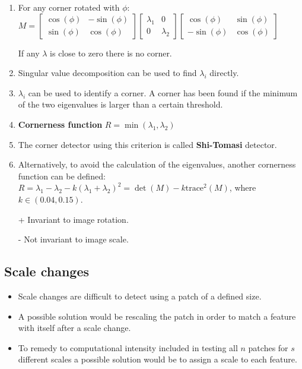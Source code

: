 \documentclass[10pt,a4paper]{scrartcl}
\begin{document}
\begin{multicols*}{2}
\begin{enumerate}
\item For any corner rotated with $\phi$: $M=\begin{bmatrix}
\cos(\phi)&-\sin(\phi)\\\sin(\phi)&\cos(\phi)
\end{bmatrix}
\begin{bmatrix}
\lambda_1&0\\0&\lambda_2
\end{bmatrix}
\begin{bmatrix}
\cos(\phi)&\sin(\phi)\\-\sin(\phi)&\cos(\phi)
\end{bmatrix}$

If any $\lambda$ is close to zero there is no corner.

\item Singular value decomposition can be used to find $\lambda_i$ directly.
\item $\lambda_i$ can be used to identify a corner. A corner has been found if the minimum of the two eigenvalues is larger than a certain threshold.
\item \textbf{Cornerness function} $R=\min(\lambda_1,\lambda_2)$

\item The corner detector using this criterion is called \textbf{Shi-Tomasi} detector.
\item Alternatively, to avoid the calculation of the eigenvalues, another cornerness function can be defined: $R=\lambda_1-\lambda_2-k(\lambda_1+\lambda_2)^2=\det(M)-k\text{trace}^2(M)$, where $k\in(0.04,0.15)$.
\end{enumerate}

\begin{itemize}
\item[+] Invariant to image rotation.
\item[-] Not invariant to image scale.
\end{itemize}

\subsection{Scale changes}

\begin{itemize}
\item Scale changes are difficult to detect using a patch of a defined size.
\item A possible solution would be rescaling the patch in order to match a feature with itself after a scale change.
\item To remedy to computational intensity included in testing all $n$ patches for $s$ different scales a possible solution would be to assign a scale to each feature.
\end{itemize}


\end{multicols*}
\end{document}
